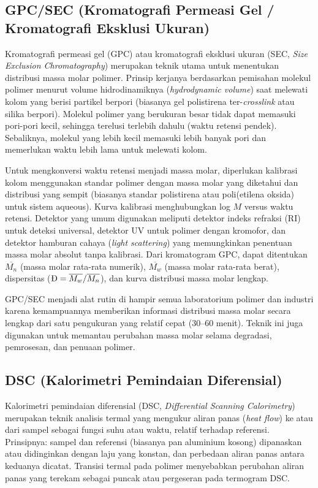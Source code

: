 \documentclass[12pt,a4paper,openany]{book}
\begin{document}
\subsection{GPC/SEC (Kromatografi Permeasi Gel / Kromatografi Eksklusi Ukuran)}

Kromatografi permeasi gel (GPC) atau kromatografi eksklusi ukuran (SEC, \textit{Size Exclusion Chromatography}) merupakan teknik utama untuk menentukan distribusi massa molar polimer. Prinsip kerjanya berdasarkan pemisahan molekul polimer menurut volume hidrodinamiknya (\textit{hydrodynamic volume}) saat melewati kolom yang berisi partikel berpori (biasanya gel polistirena ter-\textit{crosslink} atau silika berpori). Molekul polimer yang berukuran besar tidak dapat memasuki pori-pori kecil, sehingga terelusi terlebih dahulu (waktu retensi pendek). Sebaliknya, molekul yang lebih kecil memasuki lebih banyak pori dan memerlukan waktu lebih lama untuk melewati kolom.

Untuk mengkonversi waktu retensi menjadi massa molar, diperlukan kalibrasi kolom menggunakan standar polimer dengan massa molar yang diketahui dan distribusi yang sempit (biasanya standar polistirena atau poli(etilena oksida) untuk sistem aqueous). Kurva kalibrasi menghubungkan log $M$ versus waktu retensi. Detektor yang umum digunakan meliputi detektor indeks refraksi (RI) untuk deteksi universal, detektor UV untuk polimer dengan kromofor, dan detektor hamburan cahaya (\textit{light scattering}) yang memungkinkan penentuan massa molar absolut tanpa kalibrasi. Dari kromatogram GPC, dapat ditentukan $\overline{M_n}$ (massa molar rata-rata numerik), $\overline{M_w}$ (massa molar rata-rata berat), dispersitas ($\text{\DH} = \overline{M_w}/\overline{M_n}$), dan kurva distribusi massa molar lengkap.

GPC/SEC menjadi alat rutin di hampir semua laboratorium polimer dan industri karena kemampuannya memberikan informasi distribusi massa molar secara lengkap dari satu pengukuran yang relatif cepat (30--60 menit). Teknik ini juga digunakan untuk memantau perubahan massa molar selama degradasi, pemrosesan, dan penuaan polimer.

\subsection{DSC (Kalorimetri Pemindaian Diferensial)}

Kalorimetri pemindaian diferensial (DSC, \textit{Differential Scanning Calorimetry}) merupakan teknik analisis termal yang mengukur aliran panas (\textit{heat flow}) ke atau dari sampel sebagai fungsi suhu atau waktu, relatif terhadap referensi. Prinsipnya: sampel dan referensi (biasanya pan aluminium kosong) dipanaskan atau didinginkan dengan laju yang konstan, dan perbedaan aliran panas antara keduanya dicatat. Transisi termal pada polimer menyebabkan perubahan aliran panas yang terekam sebagai puncak atau pergeseran pada termogram DSC.
\end{document}
